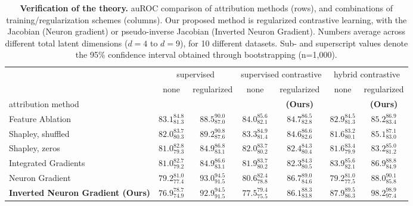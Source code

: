     \begin{table*}[t]
    \centering
    \small
        \caption{%
        \textbf{Verification of the theory.} auROC comparison of attribution methods (rows), and combinations of training/regularization schemes (columns). Our proposed method is regularized contrastive learning, with the Jacobian (Neuron gradient) or pseudo-inverse Jacobian (Inverted Neuron Gradient). Numbers average across different total latent dimensions ($d=4$ to $d=9$), for 10 different datasets. Sub- and superscript values denote the 95\% confidence interval obtained through bootstrapping (n=1,000).
    }
    \label{tbl:summary}
    \begin{tabular}{lcccccc}
    \toprule
     & \multicolumn{2}{c}{supervised} & \multicolumn{2}{c}{supervised contrastive} & \multicolumn{2}{c}{hybrid contrastive} \\
     & none & regularized & none & regularized & none & regularized \\
    attribution method &  &  &  & \textbf{(Ours)} &  &  \textbf{(Ours)} \\
    \midrule
    Feature Ablation & $83.1_{81.3}^{84.8}$ & $88.5_{87.0}^{90.0}$ & $84.0_{82.1}^{85.6}$ & $84.7_{82.8}^{86.5}$ & $82.9_{81.3}^{84.5}$ & $85.2_{83.4}^{86.9}$ \\
    Shapley, shuffled & $82.0_{80.3}^{83.7}$ & $89.2_{87.6}^{90.8}$ & $83.3_{81.4}^{84.9}$ & $84.6_{82.6}^{86.6}$ & $81.6_{80.1}^{83.2}$ & $85.1_{83.0}^{87.1}$ \\
    Shapley, zeros & $81.0_{79.3}^{82.8}$ & $84.9_{83.1}^{86.8}$ & $82.0_{80.2}^{83.7}$ & $82.4_{80.4}^{84.3}$ & $81.6_{79.9}^{83.4}$ & $83.2_{81.2}^{85.0}$ \\
    Integrated Gradients & $81.0_{79.2}^{82.7}$ & $84.9_{83.1}^{86.6}$ & $81.9_{80.2}^{83.7}$ & $82.3_{80.5}^{84.3}$ & $83.9_{82.1}^{85.6}$ & $86.9_{84.9}^{88.8}$ \\
    Neuron Gradient & $79.2_{77.4}^{81.0}$ & $93.0_{91.5}^{94.5}$ & $80.6_{78.8}^{82.4}$ & $86.7_{84.6}^{89.0}$ & $79.2_{77.5}^{81.0}$ & $88.0_{85.8}^{90.1}$ \\
    \midrule
    \textbf{Inverted Neuron Gradient (Ours)}& $76.9_{74.9}^{78.7}$ & $92.9_{91.5}^{94.5}$ & $77.5_{75.5}^{79.4}$ & $86.1_{83.8}^{88.3}$ & $87.9_{86.3}^{89.5}$ & $\mathbf{98.2_{97.4}^{98.9}}$ \\
    \bottomrule
    \end{tabular}
    \end{table*}
    
